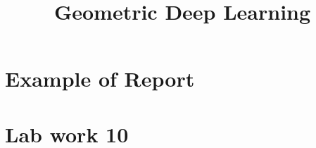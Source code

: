 \documentclass[a4paper,14pt]{article}
\title{Geometric Deep Learning}
\date{}
\numberwithin{equation}{section}
\begin{document}
    \maketitle
    \tableofcontents
    
    \clearpage
    \section{Example of Report} %
    {} %
    
    \clearpage
    \section{Lab work 10} %
    {} %

    \clearpage
    \printbibliography
\end{document}
